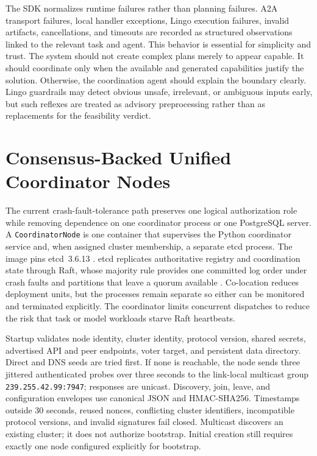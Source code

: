 The SDK normalizes runtime failures rather than planning failures. A2A transport failures, local handler exceptions, Lingo execution failures, invalid artifacts, cancellations, and timeouts are recorded as structured observations linked to the relevant task and agent. This behavior is essential for simplicity and trust. The system should not create complex plans merely to appear capable. It should coordinate only when the available and generated capabilities justify the solution. Otherwise, the coordination agent should explain the boundary clearly. Lingo guardrails may detect obvious unsafe, irrelevant, or ambiguous inputs early, but such reflexes are treated as advisory preprocessing rather than as replacements for the feasibility verdict.

\section{Consensus-Backed Unified Coordinator Nodes}

The current crash-fault-tolerance path preserves one logical authorization role while removing dependence on one coordinator process or one PostgreSQL server. A \texttt{CoordinatorNode} is one container that supervises the Python coordinator service and, when assigned cluster membership, a separate etcd process. The image pins etcd~3.6.13 \cite{etcd3613release}. etcd replicates authoritative registry and coordination state through Raft, whose majority rule provides one committed log order under crash faults and partitions that leave a quorum available \cite{ongaro2014raft}. Co-location reduces deployment units, but the processes remain separate so either can be monitored and terminated explicitly. The coordinator limits concurrent dispatches to reduce the risk that task or model workloads starve Raft heartbeats.

Startup validates node identity, cluster identity, protocol version, shared secrets, advertised API and peer endpoints, voter target, and persistent data directory. Direct and DNS seeds are tried first. If none is reachable, the node sends three jittered authenticated probes over three seconds to the link-local multicast group \texttt{239.255.42.99:7947}; responses are unicast. Discovery, join, leave, and configuration envelopes use canonical JSON and HMAC-SHA256. Timestamps outside 30 seconds, reused nonces, conflicting cluster identifiers, incompatible protocol versions, and invalid signatures fail closed. Multicast discovers an existing cluster; it does not authorize bootstrap. Initial creation still requires exactly one node configured explicitly for bootstrap.

